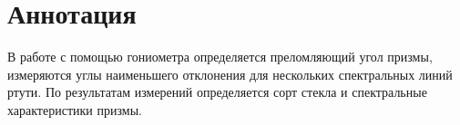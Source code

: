 \section*{Аннотация}

В работе с помощью гониометра определяется преломляющий угол призмы, измеряются углы наименьшего отклонения для нескольких спектральных линий ртути. По результатам измерений определяется сорт стекла и спектральные характеристики призмы.